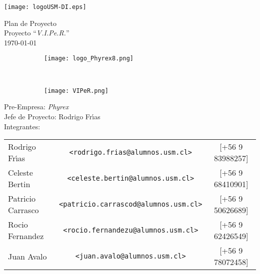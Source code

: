 \begin{titlepage} %
\thispagestyle{empty} %
\begin{center}
\texttt{[image: logoUSM-DI.eps]}
\end{center}

\vspace{3cm} %
\begin{center} %
  {
    \Huge Plan de Proyecto\\
    \huge Proyecto ``\emph{V.I.Pe.R.}''\\
    \normalsize\today
  }
\end{center}

\vspace{1cm}

\begin{figure}[H]
  \centering
  \begin{subfigure}[b]{0.4\textwidth}
    \centering
    \texttt{[image: logo\_Phyrex8.png]}
    \label{fig:Phyrex}
  \end{subfigure}
  ~
  \begin{subfigure}[b]{0.25\textwidth}
    \centering
    \texttt{[image: VIPeR.png]}
    \label{fig:Viper}
  \end{subfigure}
\end{figure}

\vfill
\begin{flushleft} %
Pre-Empresa: \emph{Phyrex}\\
Jefe de Proyecto: Rodrigo Fr\'{\i}as\\
Integrantes:
\begin{table}[hb]
  \begin{tabular}{lcc}
    Rodrigo Fr\'{\i}as & \texttt{\small <rodrigo.frias@alumnos.usm.cl>} & [+56 9 83988257] \\
    Celeste Bertin & \texttt{\small <celeste.bertin@alumnos.usm.cl>} &[+56 9 68410901]\\
    Patricio Carrasco &\texttt{\small <patricio.carrascod@alumnos.usm.cl>} &[+56 9 50626689]\\
    Rocio Fernandez &\texttt{\small <rocio.fernandezu@alumnos.usm.cl>} & [+56 9 62426549]\\
    Juan Avalo & \texttt{\small <juan.avalo@alumnos.usm.cl>} & [+56 9 78072458]\\
  \end{tabular}
\end{table}
\end{flushleft}
\end{titlepage}
